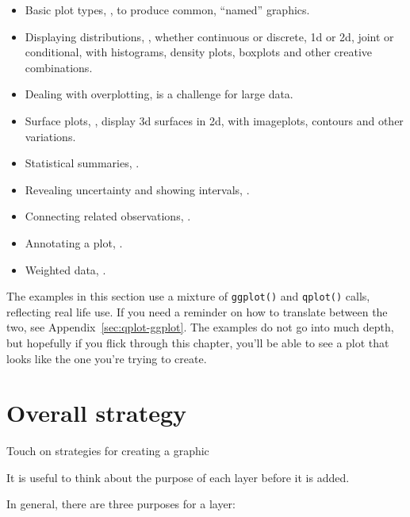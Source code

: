 \begin{itemize}
  \item Basic plot types, , to produce common, ``named'' graphics.
  
  \item Displaying distributions, , whether continuous or discrete, 1d or 2d, joint or conditional, with histograms, density plots, boxplots and other creative combinations.
  
  \item Dealing with overplotting,  is a challenge for large data.

  \item Surface plots, , display 3d surfaces in 2d, with imageplots, contours and other variations.

  \item Statistical summaries, .

  \item Revealing uncertainty and showing intervals, .

  \item Connecting related observations, .

  \item Annotating a plot, .

  \item Weighted data, .
\end{itemize}

The examples in this section use a mixture of {\tt ggplot()} and {\tt qplot()} calls, reflecting real life use.  If you need a reminder on how to translate between the two, see Appendix~\ref{sec:qplot-ggplot}.  The examples do not go into much depth, but hopefully if you flick through this chapter, you'll be able to see a plot that looks like the one you're trying to create.

\section{Overall strategy}
\label{sec:strategy}

Touch on strategies for creating a graphic

It is useful to think about the purpose of each layer before it is added.  

In general, there are three purposes for a layer:

